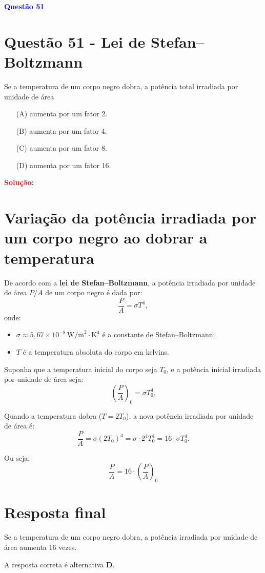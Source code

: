 \documentclass[a4paper,12pt]{article}
\begin{document}
\begin{flushleft}
\textbf{\textcolor{blue}{\Large Quest\~ao 51}}\\
\noindent
\section{Quest\~ao 51 - Lei de Stefan--Boltzmann}
Se a temperatura de um corpo negro dobra, a potência total
irradiada por unidade de área

\begin{itemize}
\item[(A)] aumenta por um fator 2.
\item[(B)] aumenta por um fator 4.
\item[(C)] aumenta por um fator 8.
\item[(D)] aumenta por um fator 16.
\end{itemize}

\vspace{0.5cm}

\textcolor{red}{\textbf{Solução:}}\\
\section*{Variação da potência irradiada por um corpo negro ao dobrar a temperatura}

De acordo com a \textbf{lei de Stefan--Boltzmann}, a potência irradiada por unidade de área \( P/A \) de um corpo negro é dada por:
\[
\frac{P}{A} = \sigma T^4,
\]
onde:
\begin{itemize}
    \item \( \sigma \approx 5,67 \times 10^{-8} \, \text{W/m}^2\cdot\text{K}^4 \) é a constante de Stefan--Boltzmann;
    \item \( T \) é a temperatura absoluta do corpo em kelvins.
\end{itemize}

Suponha que a temperatura inicial do corpo seja \( T_0 \), e a potência inicial irradiada por unidade de área seja:
\[
\left( \frac{P}{A} \right)_0 = \sigma T_0^4.
\]

Quando a temperatura dobra (\( T = 2T_0 \)), a nova potência irradiada por unidade de área é:
\[
\frac{P}{A} = \sigma (2T_0)^4 = \sigma \cdot 2^4 T_0^4 = 16 \cdot \sigma T_0^4.
\]

Ou seja:
\[
\frac{P}{A} = 16 \cdot \left( \frac{P}{A} \right)_0
\]

\section*{Resposta final}

Se a temperatura de um corpo negro dobra, a potência irradiada por unidade de área aumenta 16 vezes.

A resposta correta é alternativa \colorbox{green!50}{\textbf{D}}.
\end{flushleft}
\end{document}
